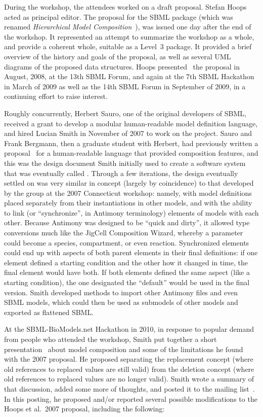 During the workshop, the attendees worked on a draft proposal.  Stefan Hoops acted as principal editor.  The proposal for the SBML package (which was renamed \emph{Hierarchical Model Composition}~\citep{hoops:2007}), was issued one day after the end of the workshop.  It represented an attempt to summarize the workshop as a whole, and provide a coherent whole, suitable as a Level~3 package.  It provided a brief overview of the history and goals of the proposal, as well as several UML diagrams of the proposed data structures.  Hoops presented~\citep{hoops:2008} the proposal in August, 2008, at the 13th SBML Forum, and again at the 7th SBML Hackathon in March of 2009 as well as the 14th SBML Forum in September of 2009, in a continuing effort to raise interest.

Roughly concurrently, Herbert Sauro, one of the original developers of SBML, received a grant to develop a modular human-readable model definition language, and hired Lucian Smith in November of 2007 to work on the project.  Sauro and Frank Bergmann, then a graduate student with Herbert, had previously written a proposal~\citep{bergmann:2006} for a human-readable language that provided composition features, and this was the design document Smith initially used to create a software system that was eventually called . Through a few iterations, the design eventually settled on was very similar in concept (largely by coincidence) to that developed by the group at the 2007 Connecticut workshop: namely, with model definitions placed separately from their instantiations in other models, and with the ability to link (or ``synchronize'', in Antimony terminology) elements of models with each other.  Because Antimony was designed to be ``quick and dirty'', it allowed type conversions much like the JigCell Composition Wizard, whereby a parameter could become a species, compartment, or even reaction.  Synchronized elements could end up with aspects of both parent elements in their final definitions: if one element defined a starting condition and the other how it changed in time, the final element would have both.  If both elements defined the same aspect (like a starting condition), the one designated the ``default'' would be used in the final version.  Smith developed methods to import other Antimony files and even SBML models, which could then be used as submodels of other models and exported as flattened SBML.

At the SBML-BioModels.net Hackathon in 2010, in response to popular demand from people who attended the workshop, Smith put together a short presentation~\citep{smith:2010} about model composition and some of the limitations he found with the 2007 proposal.  He proposed separating the replacement concept (where old references to replaced values are still valid) from the deletion concept (where old references to replaced values are no longer valid).  Smith wrote a summary of that discussion, added some more of thoughts, and posted it to the  mailing list~\citep{smith:2010b}.  In this posting, he proposed and/or reported several possible modifications to the Hoops et al.\ 2007 proposal, including the following:


